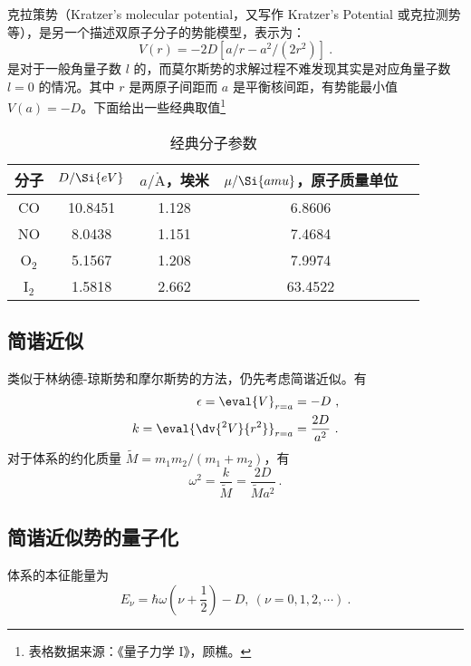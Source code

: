 

克拉策势（Kratzer's molecular potential，又写作 Kratzer's Potential 或克拉测势等），是另一个描述双原子分子的势能模型，表示为：
\begin{equation}
V(r) = -2D [a/r - a^2/(2r^2)] ~.
\end{equation}
是对于一般角量子数 $l$ 的，而莫尔斯势的求解过程不难发现其实是对应角量子数 $l=0$ 的情况。其中 $r$ 是两原子间距而 $a$ 是平衡核间距，有势能最小值 $V(a) = -D$。下面给出一些经典取值\footnote{表格数据来源：《量子力学 I》，顾樵。}
\begin{table}[ht]
\centering
\caption{经典分子参数}\label{tab_kratPo1}
\begin{tabular}{|c|c|c|c|c|}
\hline
分子 & $D/\Si{eV}$ & $a/\mathring{\text{A}}$，埃米 & $\mu/\Si{amu}$，原子质量单位\\
\hline
CO & 10.8451 & 1.128 & 6.8606 \\
\hline
NO & 8.0438 & 1.151 & 7.4684 \\
\hline
O$_2$ & 5.1567 & 1.208 & 7.9974 \\
\hline
I$_2$ & 1.5818 & 2.662 & 63.4522 \\
\hline
\end{tabular}
\end{table}

\subsection{简谐近似}
类似于林纳德-琼斯势和摩尔斯势的方法，仍先考虑简谐近似。有
\begin{equation}
\begin{aligned}
\epsilon = \eval{V}_{r=a} &= -D ~, \\
k = \eval{\dv{^2 V}{r^2}}_{r=a} &= \frac{2D}{a^2} ~.
\end{aligned}
\end{equation}
对于体系的约化质量 $\widetilde M = m_1m_2/(m_1+m_2)$，有
$$\omega^2 = \frac{k}{\widetilde M} = \frac{2D}{\widetilde M a^2} ~.$$

\subsection{简谐近似势的量子化}
体系的本征能量为
\begin{equation}
E_\nu = \hbar \omega\left(\nu + \frac12\right) - D, \ (\nu = 0, 1, 2, \cdots) ~.
\end{equation}


